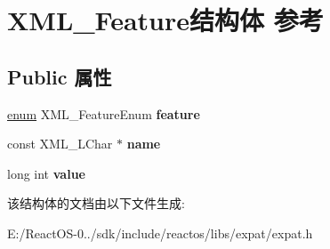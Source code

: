 \hypertarget{struct_x_m_l___feature}{}\section{X\+M\+L\+\_\+\+Feature结构体 参考}
\label{struct_x_m_l___feature}
\subsection*{Public 属性}
\begin{DoxyCompactItemize}
\item 
\mbox{\label{struct_x_m_l___feature_ae66421def7745a794da86612a9464b48}} 
\hyperlink{interfaceenum}{enum} X\+M\+L\+\_\+\+Feature\+Enum {\bfseries feature}
\item 
\mbox{\label{struct_x_m_l___feature_a0c69fbed3789a944a6c9168b1a6e5add}} 
const X\+M\+L\+\_\+\+L\+Char $\ast$ {\bfseries name}
\item 
\mbox{\label{struct_x_m_l___feature_a4d50cc5cb43a39f49435d0e81a4189dd}} 
long int {\bfseries value}
\end{DoxyCompactItemize}


该结构体的文档由以下文件生成\+:\begin{DoxyCompactItemize}
\item 
E\+:/\+React\+O\+S-\/0../sdk/include/reactos/libs/expat/expat.\+h\end{DoxyCompactItemize}
